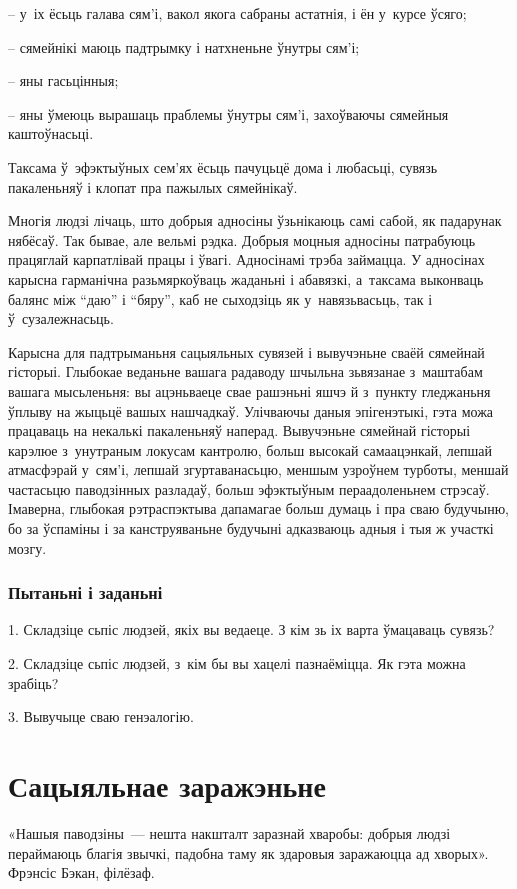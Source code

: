 – у~іх ёсьць галава сям'і, вакол якога сабраны астатнія, і ён у~курсе ўсяго;

– сямейнікі маюць падтрымку і натхненьне ўнутры сям'і;

– яны гасьцінныя;

– яны ўмеюць вырашаць праблемы ўнутры сям'і, захоўваючы сямейныя каштоўнасьці.

Таксама ў~эфэктыўных сем'ях ёсьць пачуцьцё дома і любасьці, сувязь пакаленьняў і клопат пра пажылых сямейнікаў.

Многія людзі лічаць, што добрыя адносіны ўзьнікаюць самі сабой, як падарунак нябёсаў. Так бывае, але вельмі рэдка. Добрыя моцныя адносіны патрабуюць працяглай карпатлівай працы і ўвагі. Адносінамі трэба займацца. У адносінах карысна гарманічна разьмяркоўваць жаданьні і абавязкі, а~таксама выконваць балянс між ``даю'' і ``бяру'', каб не сыходзіць як у~навязьвасьць, так і ў~сузалежнасьць.

Карысна для падтрыманьня сацыяльных сувязей і вывучэньне сваёй сямейнай гісторыі. Глыбокае веданьне вашага радаводу шчыльна зьвязанае з~маштабам вашага мысьленьня: вы ацэньваеце свае рашэньні яшчэ й з~пункту гледжаньня ўплыву на жыцьцё вашых нашчадкаў. Улічваючы даныя эпігенэтыкі, гэта можа працаваць на некалькі пакаленьняў наперад. Вывучэньне сямейнай гісторыі карэлюе з~унутраным локусам кантролю, больш высокай самаацэнкай, лепшай атмасфэрай у~сям'і, лепшай згуртаванасьцю, меншым узроўнем турботы, меншай частасьцю паводзінных разладаў, больш эфэктыўным пераадоленьнем стрэсаў. Імаверна, глыбокая рэтраспэктыва дапамагае больш думаць і пра сваю будучыню, бо за ўспаміны і за канструяваньне будучыні адказваюць адныя і тыя ж участкі мозгу.

\subsubsection{Пытаньні і заданьні}

1. Складзіце сьпіс людзей, якіх вы ведаеце. З кім зь іх варта ўмацаваць сувязь?

2. Складзіце сьпіс людзей, з~кім бы вы хацелі пазнаёміцца. Як гэта можна зрабіць?

3. Вывучыце сваю генэалогію.


\section{Сацыяльнае заражэньне}

«Нашыя паводзіны~--- нешта накшталт заразнай хваробы: добрыя людзі пераймаюць благія звычкі, падобна таму як здаровыя заражаюцца ад хворых». Фрэнсіс Бэкан, філёзаф. 

